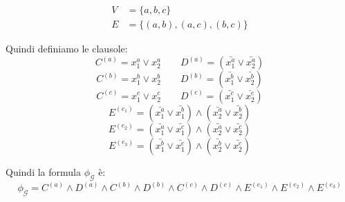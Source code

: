 \begin{minipage}{0.5\textwidth}
    \begin{figure}[H]
        \centering
    \end{figure}
\end{minipage}
\begin{minipage}{0.5\textwidth}
    \begin{align*}
        V &= \{a, b, c\} \\
        E &= \{(a, b), (a, c), (b, c)\}
    \end{align*}
\end{minipage}

Quindi definiamo le clausole:
\[
  C^{(a)} = x_1^a \lor x_2^a
 \qquad
  D^{(a)} = (\bar{x_1^a} \lor \bar{x_2^a})
\]
\[
  C^{(b)} = x_1^b \lor x_2^b
  \qquad
  D^{(b)} = (\bar{x_1^b} \lor \bar{x_2^b})
\]
\[
  C^{(c)} = x_1^c \lor x_2^c
  \qquad
  D^{(c)} = (\bar{x_1^c} \lor \bar{x_2^c})
\]
\[ 
    E^{(e_1)} = (\bar{x_1^a} \lor \bar{x_1^b}) \land (\bar{x_2^a} \lor \bar{x_2^b})
\]
\[ 
    E^{(e_2)} = (\bar{x_1^a} \lor \bar{x_1^c}) \land (\bar{x_2^a} \lor \bar{x_2^c})
\]
\[ 
    E^{(e_3)} = (\bar{x_1^b} \lor \bar{x_1^c}) \land (\bar{x_2^b} \lor \bar{x_2^c})
\]

Quindi la formula $\phi_\mathcal{G}$ è:
\[
    \phi_\mathcal{G} = C^{(a)} \land D^{(a)} \land C^{(b)} \land D^{(b)} \land C^{(c)} \land D^{(c)} \land E^{(e_1)} \land E^{(e_2)} \land E^{(e_3)}
\]

